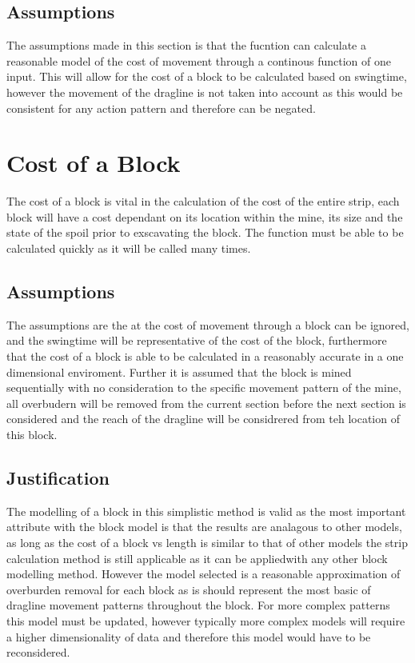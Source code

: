 \subsection{Assumptions}
The assumptions made in this section is that the fucntion can calculate a reasonable model of the cost of movement through a continous function of one input. This will allow for the cost of a block to be calculated based on swingtime, however the movement of the dragline is not taken into account as this would be consistent for any action pattern and therefore can be negated. 

\section{Cost of a Block}
The cost of a block is vital in the calculation of the cost of the entire strip, each block will have a cost dependant on its location within the mine, its size and the state of the spoil prior to exscavating the block. The function must be able to be calculated quickly as it will be called many times.
\subsection{Assumptions}
The assumptions are the at the cost of movement through a block can be ignored, and the swingtime will be representative of the cost of the block, furthermore that the cost of a block is able to be calculated in a reasonably accurate in a one dimensional enviroment. Further it is assumed that the block is mined sequentially with no consideration to the specific movement pattern of the mine, all overbudern will be removed from the current section before the next section is considered and the reach of the dragline will be considrered from teh location of this block.  
\subsection{Justification}
The modelling of a block in this simplistic method is valid as the most important attribute with the block model is that the results are analagous to other models, as long as the cost of a block vs length is similar to that of other models the strip calculation method is still applicable as it can be appliedwith any other block modelling method. However the model selected is a reasonable approximation of overburden removal for each block as is should represent the most basic of dragline movement patterns throughout the block. For more complex patterns this model must be updated, however typically more complex models will require a higher dimensionality of data and therefore this model would have to be reconsidered.  


